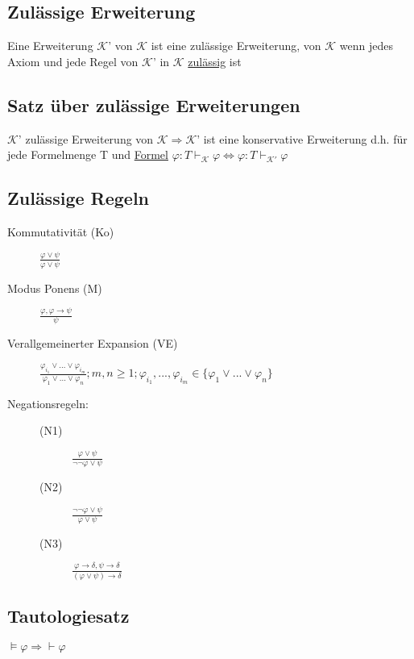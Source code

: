 \documentclass[12pt,a4paper]{article} %
\begin{document}
	\subsection{Zulässige Erweiterung}
	Eine Erweiterung $\mathcal{K}$' von $\mathcal{K}$ ist eine zulässige Erweiterung, von $\mathcal{K}$ wenn jedes Axiom und jede Regel von $\mathcal{K}$' in $\mathcal{K}$ \hyperref[Zulassig]{zulässig} ist
	
	\subsection{Satz über zulässige Erweiterungen}
	$\mathcal{K}$' zulässige Erweiterung von $\mathcal{K} \Rightarrow \mathcal{K}$' ist eine konservative Erweiterung d.h. für jede Formelmenge T und \hyperref[Formel]{Formel} $\varphi: T \hyperref[Beweisbar]{\vdash_{\mathcal{K}}} \varphi \Leftrightarrow \varphi: T \hyperref[Beweisbar]{\vdash_{\mathcal{K}'}} \varphi$
	
	\subsection{Zulässige Regeln}
	\begin{description}
		\item[Kommutativität (Ko)] $\frac{\varphi \lor \psi}{\varphi \lor \psi}$
		\item[Modus Ponens (M)] $\frac{\varphi, \varphi \rightarrow \psi}{\psi}$
		\item[Verallgemeinerter Expansion (VE)] $\frac{\varphi_{i_1} \lor ... \lor \varphi_{i_m}}{\varphi_1 \lor ... \lor \varphi_n}; m, n \ge 1; \varphi_{i_1}, ..., \varphi_{i_m} \in \{\varphi_1 \lor ... \lor \varphi_n\}$
		\item[Negationsregeln:] \begin{description}
			\item[(N1)] $\frac{\varphi \lor \psi}{\neg \neg \varphi \lor \psi}$
			\item[(N2)] $\frac{\neg \neg \varphi \lor \psi}{\varphi \lor \psi}$
			\item[(N3)] $\frac{\varphi \rightarrow \delta, \psi \rightarrow \delta}{(\varphi \lor \psi) \rightarrow \delta}$
		\end{description}
	\end{description}
	
	\subsection{Tautologiesatz}
	$\hyperref[Erfullbar]{\vDash} \varphi \Rightarrow \hyperref[Beweisbar]{\vdash} \varphi$
	
\end{document}
